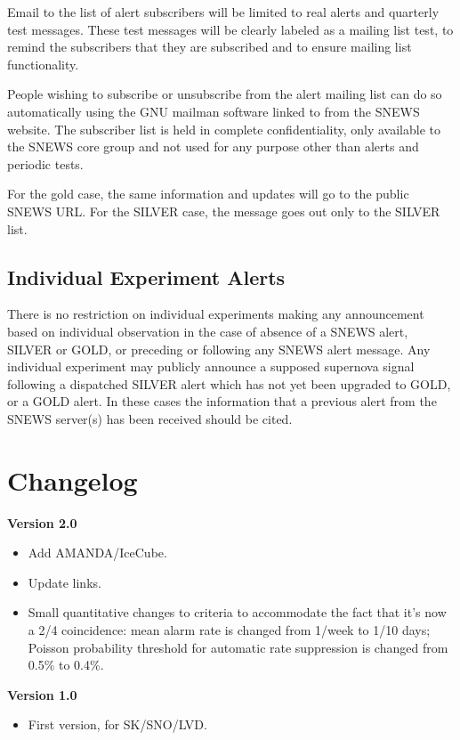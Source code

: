 \documentclass{article}
\begin{document}
Email to the list of alert subscribers will be limited to real alerts
and quarterly test messages.  These test messages will be clearly
labeled as a mailing list test, to remind the subscribers that they are
subscribed and to ensure mailing list functionality.

People wishing to subscribe or unsubscribe from the alert mailing list
can do so automatically using the GNU mailman software linked to from
the SNEWS website.  The subscriber list is held in complete
confidentiality, only available to the SNEWS core group and not used for
any purpose other than alerts and periodic tests.


For the gold case, the same information and updates will go
to the public SNEWS URL.
For the SILVER case, the message goes out only to the SILVER list.

\subsection{Individual Experiment Alerts}

There is no restriction on individual experiments making any
announcement based on individual observation in the case of absence of
a SNEWS alert, SILVER or GOLD, or preceding or following any SNEWS
alert message.  Any individual experiment may publicly announce a
supposed supernova signal following a dispatched SILVER alert which
has not yet been upgraded to GOLD, or a GOLD alert.  In these cases
the information that a previous alert from the SNEWS server(s) has
been received should be cited.

                                         
\section{Changelog}

\noindent
\textbf{Version 2.0}
\begin{itemize}
\item Add AMANDA/IceCube.
\item Update links.
\item Small quantitative changes to criteria to accommodate the fact that it's
now a 2/4 coincidence:  mean alarm rate is changed from 1/week to 1/10
days; Poisson probability threshold for automatic rate suppression 
is changed from 0.5\% to 0.4\%.  
\end{itemize}

\noindent
\textbf{Version 1.0}
\begin{itemize}
\item First version, for SK/SNO/LVD.
\end{itemize}
\end{document}
